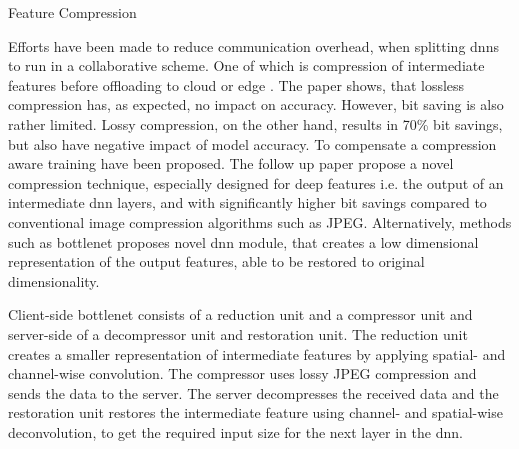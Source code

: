 \begin{enumdescript}
	\item[Feature Compression] 

	
	Efforts have been made to reduce communication overhead, when splitting \gls{dnn}s to run in a collaborative scheme. One of which is compression of intermediate features before offloading to cloud or edge \cite{choi_deep_2018}. The paper shows, that lossless compression has, as expected, no impact on accuracy. However, bit saving is also rather limited. Lossy compression, on the other hand, results in 70\% bit savings, but also have negative impact of model accuracy. To compensate a compression aware training have been proposed. The follow up paper \cite{choi_near-lossless_2018} propose a novel compression technique, especially designed for deep features i.e. the output of an intermediate \gls{dnn} layers, and with significantly higher bit savings compared to conventional image compression algorithms such as JPEG. Alternatively, methods such as \gls{bottlenet} \cite{eshratifar_bottlenet:_2019}  proposes novel \gls{dnn} module, that creates a low dimensional representation of the output features, able to be restored to original dimensionality. 
	
	
	
	Client-side \gls{bottlenet} consists of a reduction unit and a compressor unit and server-side of a decompressor unit and restoration unit. The reduction unit creates a smaller representation of intermediate features by applying spatial- and channel-wise convolution. The compressor uses lossy JPEG compression and sends the data to the server. The server decompresses the received data and the restoration unit restores the intermediate feature using channel- and spatial-wise deconvolution, to get the required input size for the next layer in the \gls{dnn}.
	

\end{enumdescript}
